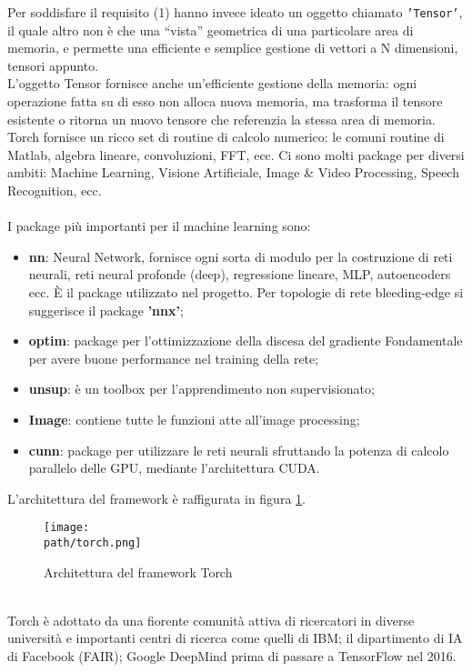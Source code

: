 Per soddisfare il requisito (1) hanno invece ideato un oggetto chiamato \texttt{'Tensor'}, il quale altro non è che una “vista” geometrica di una particolare area di memoria, e permette una efficiente e semplice 
gestione di vettori a N dimensioni, tensori appunto.\\
L’oggetto Tensor fornisce anche un’efficiente gestione della memoria: ogni operazione fatta su di esso non alloca nuova memoria, ma trasforma il tensore esistente o ritorna un nuovo tensore che referenzia la stessa area di memoria.
Torch fornisce un ricco set di routine di calcolo numerico: le comuni routine di Matlab, algebra lineare, convoluzioni, FFT, ecc. Ci sono molti package per diversi ambiti: Machine Learning, Visione Artificiale, Image \& Video Processing, Speech Recognition, ecc.\\
\\
I package più importanti per il machine learning sono: 
\begin{itemize}
\item \textbf{nn}: Neural Network, fornisce ogni sorta di modulo per la costruzione di reti neurali, reti neural profonde (deep), regressione lineare, MLP, autoencoders ecc. È il package utilizzato nel progetto. Per topologie di rete bleeding-edge si suggerisce il package \textbf{'nnx'}; 
\item  \textbf{optim}: package per l'ottimizzazione della discesa del gradiente  Fondamentale per avere buone performance nel training della rete; 
\item \textbf{unsup}: è un toolbox per l'apprendimento non supervisionato; 

\item \textbf{Image}: contiene tutte le funzioni atte all'image processing; 

\item \textbf{cunn}: package per utilizzare le reti neurali sfruttando la potenza di calcolo parallelo delle GPU, mediante l'architettura CUDA. 
\end{itemize}
L'architettura del framework è raffigurata in figura \ref{fig:torch}.\\

\begin{figure}[h!]
 \centering
 \texttt{[image: \\path/torch.png]} 
 \caption{Architettura del framework Torch}
 \label{fig:torch}
\end{figure}
\\
Torch è adottato da una fiorente comunità attiva di ricercatori in diverse università e importanti centri di ricerca come quelli di IBM; il dipartimento di IA di Facebook (FAIR); Google DeepMind prima di passare a TensorFlow nel 2016.

